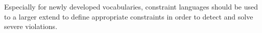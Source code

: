 \documentclass[conference]{IEEEtran}
\begin{document}
Especially for newly developed vocabularies, constraint languages should be used to a larger extend to define appropriate constraints in order to detect and solve severe violations.


\end{document}
